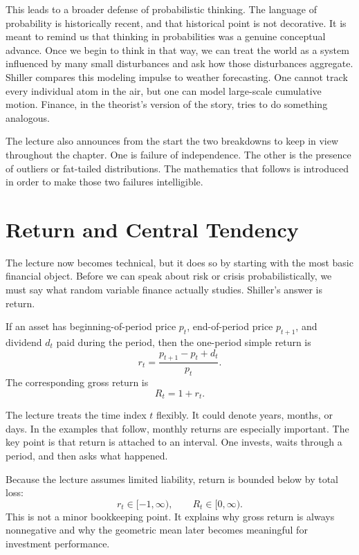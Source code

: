 This leads to a broader defense of probabilistic thinking. The language of probability is historically recent, and that historical point is not decorative. It is meant to remind us that thinking in probabilities was a genuine conceptual advance. Once we begin to think in that way, we can treat the world as a system influenced by many small disturbances and ask how those disturbances aggregate. Shiller compares this modeling impulse to weather forecasting. One cannot track every individual atom in the air, but one can model large-scale cumulative motion. Finance, in the theorist's version of the story, tries to do something analogous.

The lecture also announces from the start the two breakdowns to keep in view throughout the chapter. One is failure of independence. The other is the presence of outliers or fat-tailed distributions. The mathematics that follows is introduced in order to make those two failures intelligible.

\section{Return and Central Tendency}

The lecture now becomes technical, but it does so by starting with the most basic financial object. Before we can speak about risk or crisis probabilistically, we must say what random variable finance actually studies. Shiller's answer is return.

\begin{definition}
If an asset has beginning-of-period price \(p_t\), end-of-period price \(p_{t+1}\), and dividend \(d_t\) paid during the period, then the one-period simple return is
\begin{equation}
r_t=\frac{p_{t+1}-p_t+d_t}{p_t}.
\end{equation}
The corresponding gross return is
\begin{equation}
R_t = 1+r_t.
\end{equation}
\end{definition}

The lecture treats the time index \(t\) flexibly. It could denote years, months, or days. In the examples that follow, monthly returns are especially important. The key point is that return is attached to an interval. One invests, waits through a period, and then asks what happened.

Because the lecture assumes limited liability, return is bounded below by total loss:
\begin{equation}
r_t\in[-1,\infty), \qquad R_t\in[0,\infty).
\end{equation}
This is not a minor bookkeeping point. It explains why gross return is always nonnegative and why the geometric mean later becomes meaningful for investment performance.

